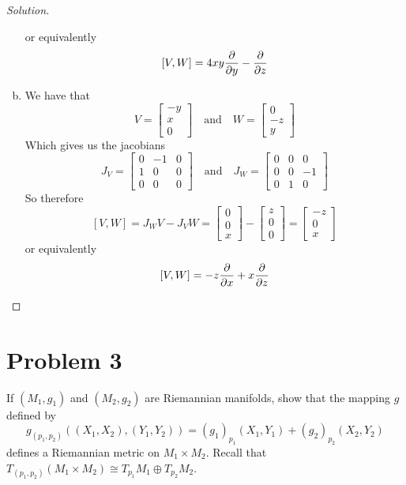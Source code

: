 \documentclass[a4paper]{article}
\begin{document}
\begin{proof}[Solution]
\begin{enumerate}[(a)]
\[      \]
      or equivalently
      \[
        [V,W] =  4xy \pdv{y} - \pdv{z}
      \]
    \item We have that
      \[
        V = \begin{bmatrix}
          -y \\
          x \\
          0
        \end{bmatrix}
        \quad \text{and} \quad 
        W = \begin{bmatrix}
          0 \\
          -z \\
          y
        \end{bmatrix}
      \]
      Which gives us the jacobians
      \[
        J_V = \begin{bmatrix}
          0 & -1 & 0 \\
          1 & 0 & 0 \\
          0 & 0 & 0
        \end{bmatrix}
        \quad \text{and} \quad 
        J_W = \begin{bmatrix}
          0 & 0 & 0 \\
          0 & 0 & -1 \\
          0 & 1 & 0
        \end{bmatrix}
      \]
      So therefore 
      \[
        [V,W] = J_WV - J_VW = \begin{bmatrix}
          0 \\
          0 \\
          x
        \end{bmatrix}
        - \begin{bmatrix}
          z \\
          0 \\
          0
        \end{bmatrix}
        = 
        \begin{bmatrix}
          -z \\
          0 \\
          x
        \end{bmatrix}
      \]
      or equivalently
      \[
        [V,W] =  -z \pdv{x} + x \pdv{z}
      \]
  \end{enumerate}
\end{proof}

\section*{Problem 3}%
If $(M_1, g_1)$ and $(M_2, g_2)$ are Riemannian manifolds, show that the mapping $g$ defined by 
\[
  g_{(p_1,p_2)}((X_1,X_2),(Y_1,Y_2)) = (g_1)_{p_1}(X_1, Y_1) + (g_2)_{p_2}(X_2, Y_2)
\]
defines a Riemannian metric on $M_1 \times M_2$. Recall that $T_{(p_1, p_2)}(M_1 \times M_2) \cong T_{p_1}M_1 \oplus T_{p_2}M_2$.
\end{document}
